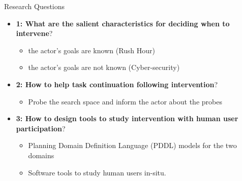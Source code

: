 \begin{frame}{Research Questions}
\begin{itemize}
\item \textbf{1: What are the salient characteristics for deciding when to intervene}?
\begin{itemize}
\item the actor's goals are known (Rush Hour)
\item the actor's goals are not known (Cyber-security)
\end{itemize}
\item \textbf{2: How to help task continuation following intervention}?
\begin{itemize}
\item Probe the search space  and inform the actor about the probes
\end{itemize}
\item \textbf{3: How to design tools to study intervention with human user participation}?
\begin{itemize}
\item Planning Domain Definition Language (PDDL) models for the two domains
\item Software tools to study human users in-situ.
\end{itemize}
\end{itemize}
\end{frame}

